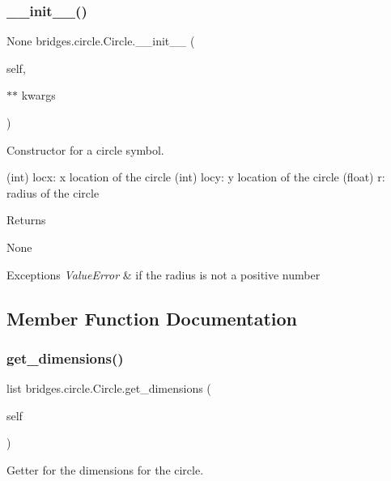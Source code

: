 \subsubsection{\texorpdfstring{\_\_init\_\_()}{\_\_init\_\_()}}
{\footnotesize\ttfamily  None bridges.\+circle.\+Circle.\+\_\+\+\_\+init\+\_\+\+\_\+ (\begin{DoxyParamCaption}\item[{}]{self,  }\item[{$\ast$$\ast$}]{kwargs }\end{DoxyParamCaption})}



Constructor for a circle symbol. 

\begin{DoxyVerb}       (int) locx: x location of the circle
       (int) locy: y location of the circle
       (float) r: radius of the circle
\end{DoxyVerb}
 \begin{DoxyReturn}{Returns}


None
\end{DoxyReturn}

\begin{DoxyExceptions}{Exceptions}
{\em Value\+Error} & if the radius is not a positive number \\
\hline
\end{DoxyExceptions}


\subsection{Member Function Documentation}
\mbox{\label{classbridges_1_1circle_1_1_circle_acb282c1119ad5da1eb6f02f4c36eb714}} 
\subsubsection{\texorpdfstring{get\_dimensions()}{get\_dimensions()}}
{\footnotesize\ttfamily  list bridges.\+circle.\+Circle.\+get\+\_\+dimensions (\begin{DoxyParamCaption}\item[{}]{self }\end{DoxyParamCaption})}



Getter for the dimensions for the circle. 


